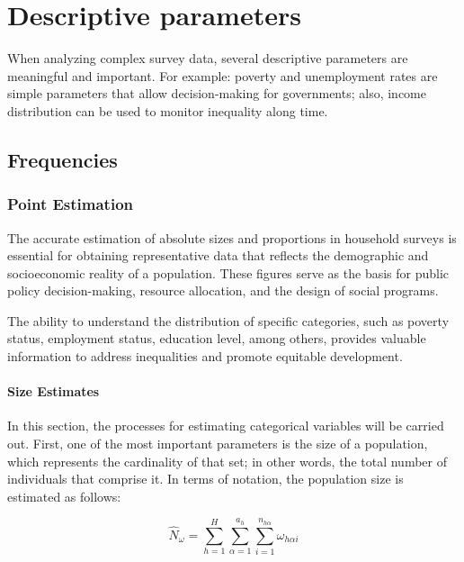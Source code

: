\documentclass[
  12pt,
]{book}
\begin{document}
\hypertarget{descriptive-parameters}{%
\chapter{Descriptive parameters}\label{descriptive-parameters}}

When analyzing complex survey data, several descriptive parameters are meaningful and important. For example: poverty and unemployment rates are simple parameters that allow decision-making for governments; also, income distribution can be used to monitor inequality along time.

\hypertarget{frequencies}{%
\section{Frequencies}\label{frequencies}}

\hypertarget{point-estimation}{%
\subsection{Point Estimation}\label{point-estimation}}

The accurate estimation of absolute sizes and proportions in household surveys is essential for obtaining representative data that reflects the demographic and socioeconomic reality of a population. These figures serve as the basis for public policy decision-making, resource allocation, and the design of social programs.

The ability to understand the distribution of specific categories, such as poverty status, employment status, education level, among others, provides valuable information to address inequalities and promote equitable development.

\hypertarget{size-estimates}{%
\subsubsection{Size Estimates}\label{size-estimates}}

In this section, the processes for estimating categorical variables will be carried out. First, one of the most important parameters is the size of a population, which represents the cardinality of that set; in other words, the total number of individuals that comprise it. In terms of notation, the population size is estimated as follows:

\[
\hat{N}_{\omega} = \sum_{h=1}^{H}\sum_{\alpha=1}^{a_{h}}\sum_{i=1}^{n_{h\alpha}}\omega_{h\alpha i}
\]
\end{document}
